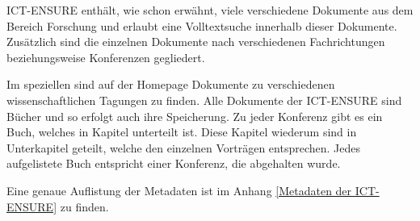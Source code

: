 \ac{ICT-ENSURE} enth\"alt, wie schon erw\"ahnt, viele verschiedene Dokumente aus dem Bereich Forschung und erlaubt eine Volltextsuche innerhalb dieser Dokumente. Zus\"atzlich sind die einzelnen Dokumente nach verschiedenen Fachrichtungen beziehungsweise Konferenzen gegliedert.
\cite{ICT-ENSURE_Bericht}

Im speziellen sind auf der Homepage Dokumente zu verschiedenen wissenschaftlichen Tagungen zu finden.
Alle Dokumente der \ac{ICT-ENSURE} sind B\"ucher und so erfolgt auch ihre Speicherung.
Zu jeder Konferenz gibt es ein Buch, welches in Kapitel unterteilt ist. Diese Kapitel wiederum sind in Unterkapitel geteilt, welche den einzelnen Vortr\"agen entsprechen. Jedes aufgelistete Buch entspricht einer Konferenz, die abgehalten wurde.

Eine genaue Auflistung der Metadaten ist im Anhang \ref{Metadaten der ICT-ENSURE} zu finden.
